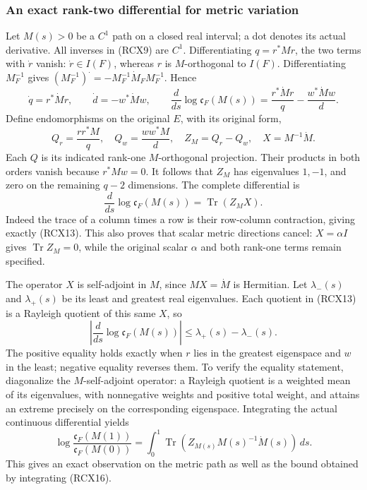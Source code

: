 \subsubsection{An exact rank-two differential for metric variation}

Let \(M(s)>0\) be a \(C^1\) path on a closed real interval; a dot denotes
its actual derivative. All inverses in (RCX9) are \(C^1\).
Differentiating \(q=r^*Mr\), the two terms with \(\dot r\) vanish:
\(\dot r\in I(F)\), whereas \(r\) is \(M\)-orthogonal to \(I(F)\).
Differentiating \(M_F^{-1}\) gives
\((M_F^{-1})^{\displaystyle\cdot}=-M_F^{-1}\dot M_F M_F^{-1}\).
Hence
\[
 \dot q=r^*\dot M r,\qquad
 \dot d=-w^*\dot M w,\qquad
 \boxed{\frac{d}{ds}\log\mathfrak c_F(M(s))
       =\frac{r^*\dot M r}{q}-\frac{w^*\dot M w}{d}.}
 \tag{RCX13}
\]
Define endomorphisms on the original \(E\), with its original form,
\[
 Q_r=\frac{rr^*M}{q},\quad Q_w=\frac{ww^*M}{d},\quad
 Z_M=Q_r-Q_w,\quad X=M^{-1}\dot M.
 \tag{RCX14}
\]
Each \(Q\) is its indicated rank-one \(M\)-orthogonal projection.
Their products in both orders vanish because \(r^*Mw=0\).
It follows that \(Z_M\) has eigenvalues \(1,-1\), and zero on the
remaining \(q-2\) dimensions. The complete differential is
\[
 \boxed{\frac{d}{ds}\log\mathfrak c_F(M(s))
            =\operatorname{Tr}(Z_M X).}
 \tag{RCX15}
\]
Indeed the trace of a column times a row is their row-column
contraction, giving exactly (RCX13). This also proves that scalar
metric directions cancel: \(X=\alpha I\) gives
\(\operatorname{Tr}Z_M=0\), while the original scalar \(\alpha\)
and both rank-one terms remain specified.

The operator \(X\) is self-adjoint in \(M\), since \(MX=\dot M\)
is Hermitian. Let \(\lambda_-(s)\) and \(\lambda_+(s)\) be its least
and greatest real eigenvalues. Each quotient in (RCX13) is a Rayleigh
quotient of this same \(X\), so
\[
 \left|\frac{d}{ds}\log\mathfrak c_F(M(s))\right|
       \le\lambda_+(s)-\lambda_-(s).
 \tag{RCX16}
\]
The positive equality holds exactly when \(r\) lies in the greatest
eigenspace and \(w\) in the least; negative equality reverses them.
To verify the equality statement, diagonalize the \(M\)-self-adjoint
operator: a Rayleigh quotient is a weighted mean of its eigenvalues,
with nonnegative weights and positive total weight, and attains an
extreme precisely on the corresponding eigenspace.
Integrating the actual continuous differential yields
\[
 \log\frac{\mathfrak c_F(M(1))}{\mathfrak c_F(M(0))}
   =\int_0^1\operatorname{Tr}(Z_{M(s)}M(s)^{-1}\dot M(s))\,ds .
 \tag{RCX17}
\]
This gives an exact observation on the metric path as well as the
bound obtained by integrating (RCX16).

